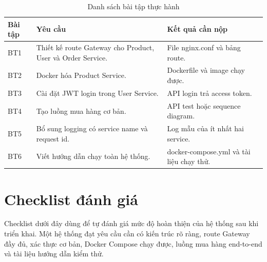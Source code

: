 \documentclass[../main.tex]{subfiles}
\begin{document}
\begin{table}[H]
    \centering
    \caption{Danh sách bài tập thực hành}
    \label{tab:chapter4-practice-exercises}
    \begin{tabular}{|p{}|p{}|p{}|}
        \hline
        \rowcolor{primary!35}
        \textbf{Bài tập} & \textbf{Yêu cầu} & \textbf{Kết quả cần nộp} \\
        \hline
        BT1 & Thiết kế route Gateway cho Product, User và Order Service. & File nginx.conf và bảng route. \\
        \hline
        BT2 & Docker hóa Product Service. & Dockerfile và image chạy được. \\
        \hline
        BT3 & Cài đặt JWT login trong User Service. & API login trả access token. \\
        \hline
        BT4 & Tạo luồng mua hàng cơ bản. & API test hoặc sequence diagram. \\
        \hline
        BT5 & Bổ sung logging có service name và request id. & Log mẫu của ít nhất hai service. \\
        \hline
        BT6 & Viết hướng dẫn chạy toàn hệ thống. & docker-compose.yml và tài liệu chạy thử. \\
        \hline
    \end{tabular}
\end{table}

\section{Checklist đánh giá}
\label{section:4.12}

Checklist dưới đây dùng để tự đánh giá mức độ hoàn thiện của hệ thống sau khi triển khai. Một hệ thống đạt yêu cầu cần có kiến trúc rõ ràng, route Gateway đầy đủ, xác thực cơ bản, Docker Compose chạy được, luồng mua hàng end-to-end và tài liệu hướng dẫn kiểm thử.
\end{document}
